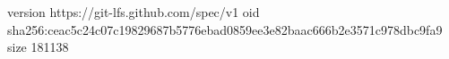 version https://git-lfs.github.com/spec/v1
oid sha256:ceac5c24c07c19829687b5776ebad0859ee3e82baac666b2e3571c978dbc9fa9
size 181138
